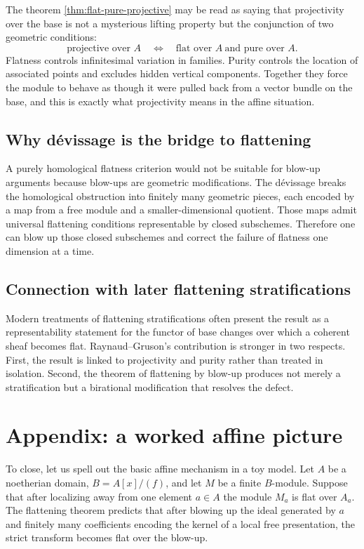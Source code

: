 \documentclass[11pt,oneside]{article}
\begin{document}
The theorem \cref{thm:flat-pure-projective} may be read as saying that projectivity over the base is not a mysterious lifting property but the conjunction of two geometric conditions:
\[
\text{projective over }A
\quad\Longleftrightarrow\quad
\text{flat over }A\ \text{and pure over }A.
\]
Flatness controls infinitesimal variation in families.  Purity controls the location of associated points and excludes hidden vertical components.  Together they force the module to behave as though it were pulled back from a vector bundle on the base, and this is exactly what projectivity means in the affine situation.

\subsection{Why d\'evissage is the bridge to flattening}

A purely homological flatness criterion would not be suitable for blow-up arguments because blow-ups are geometric modifications.  The d\'evissage breaks the homological obstruction into finitely many geometric pieces, each encoded by a map from a free module and a smaller-dimensional quotient.  Those maps admit universal flattening conditions representable by closed subschemes.  Therefore one can blow up those closed subschemes and correct the failure of flatness one dimension at a time.

\subsection{Connection with later flattening stratifications}

Modern treatments of flattening stratifications often present the result as a representability statement for the functor of base changes over which a coherent sheaf becomes flat.  Raynaud--Gruson's contribution is stronger in two respects.  First, the result is linked to projectivity and purity rather than treated in isolation.  Second, the theorem of flattening by blow-up produces not merely a stratification but a birational modification that resolves the defect.

\section{Appendix: a worked affine picture}

To close, let us spell out the basic affine mechanism in a toy model.  Let $A$ be a noetherian domain, $B=A[x]/(f)$, and let $M$ be a finite $B$-module.  Suppose that after localizing away from one element $a\in A$ the module $M_a$ is flat over $A_a$.  The flattening theorem predicts that after blowing up the ideal generated by $a$ and finitely many coefficients encoding the kernel of a local free presentation, the strict transform becomes flat over the blow-up.
\end{document}
